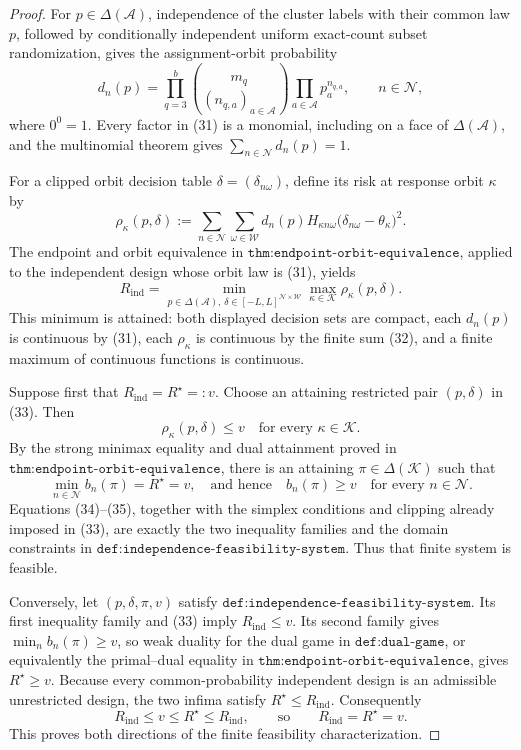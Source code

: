 \documentclass{article}
\begin{document}
\begin{proof}
For \(p\in\Delta(\mathcal A)\), independence of the cluster labels with their common law \(p\), followed by conditionally independent uniform exact-count subset randomization, gives the assignment-orbit probability
\[
d_n(p)=\prod_{q=3}^{b}
 \binom{m_q}{(n_{q,a})_{a\in\mathcal A}}
 \prod_{a\in\mathcal A}p_a^{n_{q,a}},
\qquad n\in\mathcal N,                                                     \tag{31}
\]
where \(0^0=1\).  Every factor in (31) is a monomial, including on a face of \(\Delta(\mathcal A)\), and the multinomial theorem gives \(\sum_{n\in\mathcal N}d_n(p)=1\).

For a clipped orbit decision table \(\delta=(\delta_{n\omega})\), define its risk at response orbit \(\kappa\) by
\[
 \rho_\kappa(p,\delta)
 :=\sum_{n\in\mathcal N}\sum_{\omega\in\mathcal W}
 d_n(p)H_{\kappa n\omega}
 \bigl(\delta_{n\omega}-\theta_\kappa\bigr)^2.                            \tag{32}
\]
The endpoint and orbit equivalence in \(\texttt{thm:endpoint-orbit-equivalence}\), applied to the independent design whose orbit law is (31), yields
\[
 R_{\mathrm{ind}}
 =\min_{p\in\Delta(\mathcal A),\,
              \delta\in[-L,L]^{\mathcal N\times\mathcal W}}
       \max_{\kappa\in\mathcal K}\rho_\kappa(p,\delta).                 \tag{33}
\]
This minimum is attained: both displayed decision sets are compact, each \(d_n(p)\) is continuous by (31), each \(\rho_\kappa\) is continuous by the finite sum (32), and a finite maximum of continuous functions is continuous.

Suppose first that \(R_{\mathrm{ind}}=R^\star=:v\).  Choose an attaining restricted pair \((p,\delta)\) in (33).  Then
\[
 \rho_\kappa(p,\delta)\le v
 \quad\text{for every }\kappa\in\mathcal K.                               \tag{34}
\]
By the strong minimax equality and dual attainment proved in \(\texttt{thm:endpoint-orbit-equivalence}\), there is an attaining \(\pi\in\Delta(\mathcal K)\) such that
\[
 \min_{n\in\mathcal N}b_n(\pi)=R^\star=v,
 \quad\text{and hence}\quad
 b_n(\pi)\ge v\quad\text{for every }n\in\mathcal N.                     \tag{35}
\]
Equations (34)--(35), together with the simplex conditions and clipping already imposed in (33), are exactly the two inequality families and the domain constraints in \(\texttt{def:independence-feasibility-system}\).  Thus that finite system is feasible.

Conversely, let \((p,\delta,\pi,v)\) satisfy \(\texttt{def:independence-feasibility-system}\).  Its first inequality family and (33) imply \(R_{\mathrm{ind}}\le v\).  Its second family gives \(\min_n b_n(\pi)\ge v\), so weak duality for the dual game in \(\texttt{def:dual-game}\), or equivalently the primal--dual equality in \(\texttt{thm:endpoint-orbit-equivalence}\), gives \(R^\star\ge v\).  Because every common-probability independent design is an admissible unrestricted design, the two infima satisfy \(R^\star\le R_{\mathrm{ind}}\).  Consequently
\[
 R_{\mathrm{ind}}\le v\le R^\star\le R_{\mathrm{ind}},
 \qquad \text{so}\qquad
 R_{\mathrm{ind}}=R^\star=v.                                               \tag{36}
\]
This proves both directions of the finite feasibility characterization.


\end{proof}
\end{document}
